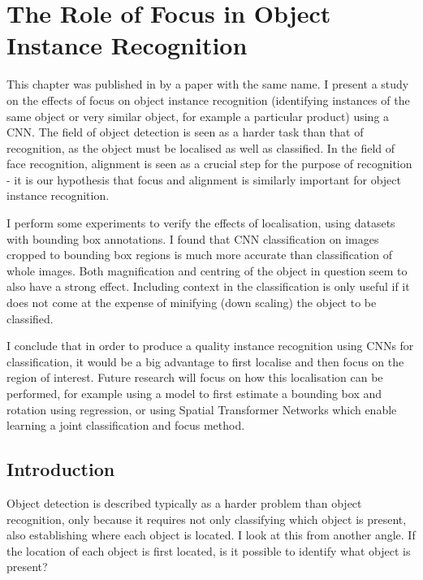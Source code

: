 
\chapter{The Role of Focus in Object Instance Recognition}
\label{chap:focus}

This chapter was published in \cite{Batchelor2017} by a paper with the same name. I present a study on the effects of focus on object instance recognition (identifying instances of the same object or very similar object, for example a particular product) using a \gls{CNN}. The field of object detection is seen as a harder task than that of recognition, as the object must be localised as well as classified. In the field of face recognition, alignment is seen as a crucial step for the purpose of recognition - it is our hypothesis that focus and alignment is similarly important for object instance recognition. 

I perform some experiments to verify the effects of localisation, using datasets with bounding box annotations. I found that CNN classification on images cropped to bounding box regions is much more accurate than classification of whole images. Both magnification and centring of the object in question seem to also have a strong effect. Including context in the classification is only useful if it does not come at the expense of minifying (down scaling) the object to be classified.
 
I conclude that in order to produce a quality instance recognition using \gls{CNN}s for classification, it would be a big advantage to first localise and then focus on the region of interest. Future research will focus on how this localisation can be performed, for example using a model to first estimate a bounding box and rotation using regression, or using Spatial Transformer Networks which enable learning a joint classification and focus method.




\section{Introduction}

Object detection is described typically as a harder problem than object recognition, only because it requires not only classifying which object is present, also establishing where each object is located. I look at this from another angle. If the location of each object is first located, is it possible to identify what object is present? 

